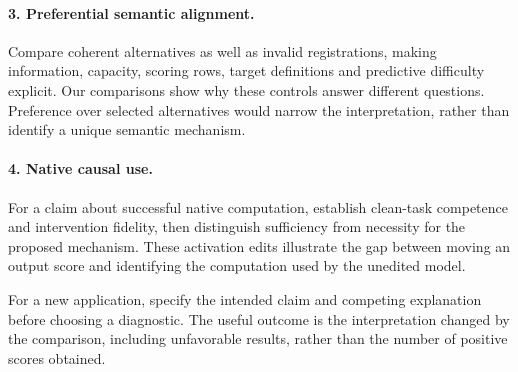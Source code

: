 \paragraph{3. Preferential semantic alignment.}
Compare coherent alternatives as well as invalid registrations, making information, capacity, scoring rows, target definitions and predictive difficulty explicit. Our comparisons show why these controls answer different questions. Preference over selected alternatives would narrow the interpretation, rather than identify a unique semantic mechanism.

\paragraph{4. Native causal use.}
For a claim about successful native computation, establish clean-task competence and intervention fidelity, then distinguish sufficiency from necessity for the proposed mechanism. These activation edits illustrate the gap between moving an output score and identifying the computation used by the unedited model.

For a new application, specify the intended claim and competing explanation before choosing a diagnostic. The useful outcome is the interpretation changed by the comparison, including unfavorable results, rather than the number of positive scores obtained.

